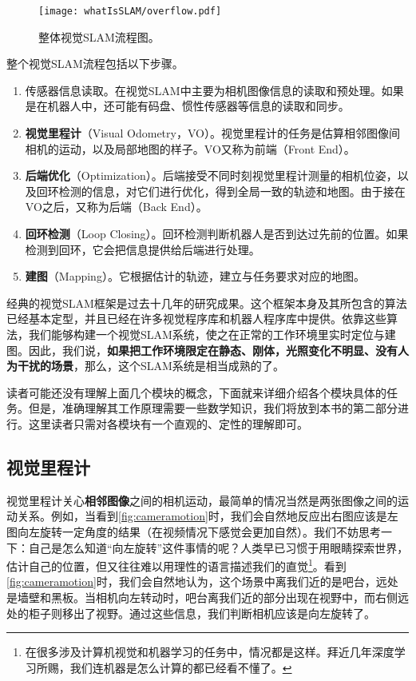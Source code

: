 \begin{figure}[!htp]
	\centering
	\texttt{[image: whatIsSLAM/overflow.pdf]}
	\caption{整体视觉SLAM流程图。}
	\label{fig:overflow}
\end{figure}

整个视觉SLAM流程包括以下步骤。
\begin{enumerate}
	\item 传感器信息读取。在视觉SLAM中主要为相机图像信息的读取和预处理。如果是在机器人中，还可能有码盘、惯性传感器等信息的读取和同步。
	\item \textbf{视觉里程计}（Visual Odometry，VO）。视觉里程计的任务是估算相邻图像间相机的运动，以及局部地图的样子。VO又称为前端（Front End）。
	\item \textbf{后端优化}（Optimization）。后端接受不同时刻视觉里程计测量的相机位姿，以及回环检测的信息，对它们进行优化，得到全局一致的轨迹和地图。由于接在VO之后，又称为后端（Back End）。
	\item \textbf{回环检测}（Loop Closing）。回环检测判断机器人是否到达过先前的位置。如果检测到回环，它会把信息提供给后端进行处理。
	\item \textbf{建图}（Mapping）。它根据估计的轨迹，建立与任务要求对应的地图。
\end{enumerate}

经典的视觉SLAM框架是过去十几年的研究成果。这个框架本身及其所包含的算法已经基本定型，并且已经在许多视觉程序库和机器人程序库中提供。依靠这些算法，我们能够构建一个视觉SLAM系统，使之在正常的工作环境里实时定位与建图。因此，我们说，\textbf{如果把工作环境限定在静态、刚体，光照变化不明显、没有人为干扰的场景}，那么，这个SLAM系统是相当成熟的了\textsuperscript{\cite{Cadena2016}}。

读者可能还没有理解上面几个模块的概念，下面就来详细介绍各个模块具体的任务。但是，准确理解其工作原理需要一些数学知识，我们将放到本书的第二部分进行。这里读者只需对各模块有一个直观的、定性的理解即可。

\subsection{视觉里程计}
视觉里程计关心\textbf{相邻图像}之间的相机运动，最简单的情况当然是两张图像之间的运动关系。例如，当看到\autoref{fig:cameramotion}时，我们会自然地反应出右图应该是左图向左旋转一定角度的结果（在视频情况下感觉会更加自然）。我们不妨思考一下：自己是怎么知道“向左旋转”这件事情的呢？人类早已习惯于用眼睛探索世界，估计自己的位置，但又往往难以用理性的语言描述我们的直觉\footnote{在很多涉及计算机视觉和机器学习的任务中，情况都是这样。拜近几年深度学习所赐，我们连机器是怎么计算的都已经看不懂了。}。看到\autoref{fig:cameramotion}时，我们会自然地认为，这个场景中离我们近的是吧台，远处是墙壁和黑板。当相机向左转动时，吧台离我们近的部分出现在视野中，而右侧远处的柜子则移出了视野。通过这些信息，我们判断相机应该是向左旋转了。


